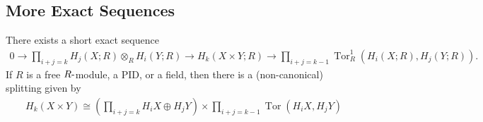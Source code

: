 \hypertarget{more-exact-sequences}{%
\subsection{More Exact Sequences}\label{more-exact-sequences}}

\begin{theorem}[Kunneth]

There exists a short exact sequence
\begin{align*}
0 \to \prod_{i+j=k} H_{j}(X; R) \otimes_{R} H_{i}(Y; R) \to H_{k}(X\times Y; R) \to \prod_{i+j=k-1} \operatorname{Tor}_{R}^1(H_{i}(X; R), H_{j}(Y; R))
.\end{align*}
If \(R\) is a free \(R{\hbox{-}}\)module, a PID, or a field, then there
is a (non-canonical) splitting given by
\begin{align*}
H_{k} (X\times Y) \cong \left( \prod_{i+j = k} H_{i} X \oplus H_{j} Y\right) \times\prod_{i+j = k-1}\operatorname{Tor}(H_{i}X, H_{j} Y) \\
\end{align*}

\end{theorem}

